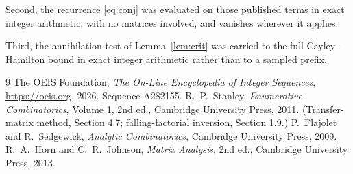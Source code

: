 \documentclass[11pt,a4paper]{article}
\theoremstyle{plain}
\theoremstyle{definition}
\begin{document}
Second, the recurrence \eqref{eq:conj} was evaluated on those published terms in exact
integer arithmetic, with no matrices involved, and vanishes wherever it applies.

Third, the annihilation test of Lemma~\ref{lem:crit} was carried to the full
Cayley--Hamilton bound in exact integer arithmetic rather than to a sampled prefix.

\begin{thebibliography}{9}
 The OEIS Foundation, \emph{The On-Line Encyclopedia of Integer
Sequences}, \url{https://oeis.org}, 2026. Sequence A282155.
 R.~P.~Stanley, \emph{Enumerative Combinatorics}, Volume 1, 2nd ed.,
Cambridge University Press, 2011. (Transfer-matrix method, Section 4.7; falling-factorial
inversion, Section 1.9.)
 P.~Flajolet and R.~Sedgewick, \emph{Analytic Combinatorics}, Cambridge
University Press, 2009.
 R.~A.~Horn and C.~R.~Johnson, \emph{Matrix Analysis}, 2nd ed., Cambridge
University Press, 2013.
\end{thebibliography}
\end{document}

